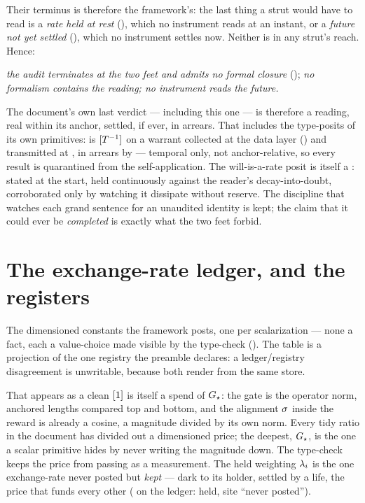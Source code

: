 \documentclass[../main]{subfiles}
\begin{document}
Their terminus is therefore the framework's: the last thing a strut would have to read is a
\emph{rate held at rest} (), which no instrument reads at an instant, or a
\emph{future not yet settled} (), which no instrument settles now. Neither is in
any strut's reach. Hence:

\emph{the audit terminates at the two feet and admits no formal closure} ();
\emph{no formalism contains the reading; no instrument reads the future.}

The document's own last verdict --- including this one --- is therefore a reading, real within
its anchor, settled, if ever, in arrears. That includes the type-posits of its own primitives:
 is $[T\sp{-1}]$ on a warrant collected at the data layer () and
transmitted at , in arrears by 
--- temporal only, not anchor-relative, so every  result is quarantined from the
self-application. The will-is-a-rate posit is itself a : stated at the start, held
continuously against the reader's decay-into-doubt, corroborated only by watching it dissipate
without reserve. The discipline that watches each grand sentence for an unaudited identity is
kept; the claim that it could ever be \emph{completed} is exactly what the two feet forbid.

\clearpage
\section{The exchange-rate ledger, and the registers}
\label{app:ledger}
%
%
%
The dimensioned constants the framework posts, one per scalarization --- none a fact, each a
value-choice made visible by the type-check (). The table is a projection of
the one registry the preamble declares: a ledger/registry disagreement is unwritable,
because both render from the same store.

\GenerateLedger

That  appears as a clean $[1]$ is itself a spend of $G\sb{\star}$: the
gate is the operator norm, anchored lengths compared top and bottom, and the alignment
$\sigma$ inside the reward is already a cosine, a magnitude divided by its own norm.
Every tidy ratio in the document has divided out a dimensioned price; the deepest,
$G\sb{\star}$, is the one a scalar primitive hides by never writing the magnitude down.
The type-check keeps the price from passing as a measurement. The held weighting
$\lambda\sb{i}$ is the one exchange-rate never posted but \emph{kept} --- dark to its
holder, settled by a life, the price that funds every other ( on the ledger:
held, site ``never posted'').
\end{document}
